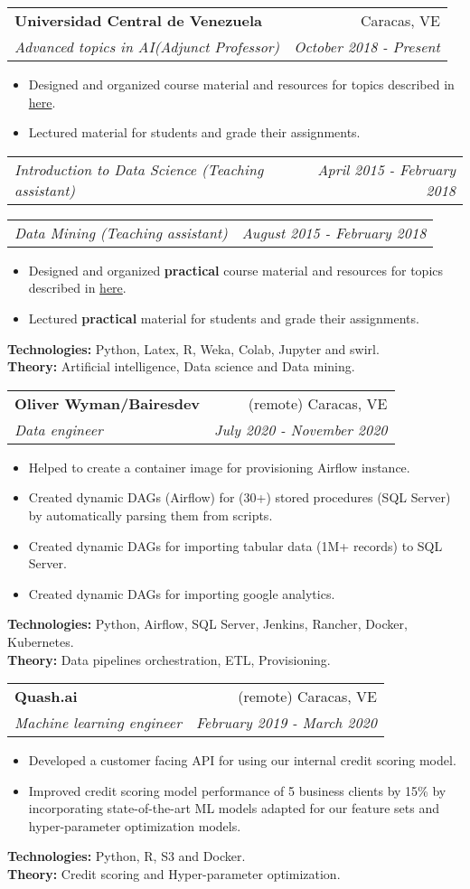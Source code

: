 \documentclass[letterpaper,11pt]{article}
\makeatletter
\newcommand{\resumeItem}[1]{%
  \item\small{
    #1
  }
}
\newcommand{\resumeSubheading}[4]{
  \vspace{8pt}\item%
    \begin{tabular*}{0.97\textwidth}[t]{l@{\extracolsep{\fill}}r}
      \textbf{#1} & #2 \\
      \textit{\small#3} & \textit{\small #4} \\
    \end{tabular*}\vspace{-5pt}
}
\newcommand{\resumeSubSubheading}[2]{
    \vspace{1pt}
    \begin{tabular*}{0.97\textwidth}{l@{\extracolsep{\fill}}r}
      \textit{\small#1} & \textit{\small #2} \\
    \end{tabular*}\vspace{-5pt}
}
\newcommand{\resumeItemListStart}{\begin{itemize}}
\newcommand{\resumeItemListEnd}{\end{itemize}\vspace{-5pt}}
\newcommand{\resumeTech}[2]{
 \textbf{#1:} #2
}
\makeatother
\begin{document}
\resumeSubheading
      {Universidad Central de Venezuela}{Caracas, VE}
      {Advanced topics in AI(Adjunct Professor)}{October 2018 - Present}
      \resumeItemListStart
      \resumeItem{Designed and organized course material and resources for topics described in \href{https://bit.ly/2VYchte}{here}.}
      \resumeItem{Lectured material for students and grade their assignments.}
      \resumeItemListEnd
\resumeSubSubheading
      {Introduction to Data Science (Teaching assistant)}{April 2015 - February 2018}
\resumeSubSubheading
     {Data Mining (Teaching assistant)}{August 2015 - February 2018}
     \resumeItemListStart
      \resumeItem{Designed and organized \textbf{practical} course material and resources for topics described in \href{https://bit.ly/2VYchte}{here}.}
      \resumeItem{Lectured \textbf{practical} material for students and grade their assignments.}
      \resumeItemListEnd
      \resumeTech{Technologies}{Python, Latex, R, Weka, Colab, Jupyter and swirl.}\\
      \resumeTech{Theory}{Artificial intelligence, Data science and Data mining.}

\resumeSubheading
      {Oliver Wyman/Bairesdev}{(remote) Caracas, VE}
      {Data engineer}{July 2020 - November 2020}
      \resumeItemListStart
      \resumeItem{Helped to create a container image for provisioning Airflow instance.}
      \resumeItem{Created dynamic DAGs (Airflow) for (30+) stored procedures (SQL Server) by automatically parsing them from scripts.}
      \resumeItem{Created dynamic DAGs for importing tabular data (1M+ records) to SQL Server.}
      \resumeItem{Created dynamic DAGs for importing google analytics.}
      \resumeItemListEnd
      \resumeTech{Technologies}{Python, Airflow, SQL Server, Jenkins, Rancher, Docker, Kubernetes.}\\
      \resumeTech{Theory}{Data pipelines orchestration, ETL, Provisioning.}

\resumeSubheading
      {Quash.ai}{(remote) Caracas, VE}
      {Machine learning engineer}{February 2019 - March 2020}
      \resumeItemListStart
      \resumeItem{Developed a customer facing API for using our internal credit scoring model.}
      \resumeItem{Improved credit scoring model performance of 5 business clients by 15\% by incorporating state-of-the-art ML models adapted for our feature sets and hyper-parameter optimization models.}
      \resumeItemListEnd
      \resumeTech{Technologies}{Python, R, S3 and Docker.}\\
      \resumeTech{Theory}{Credit scoring and Hyper-parameter optimization.}
\end{document}

